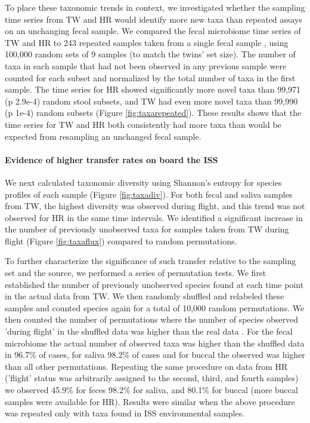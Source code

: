 To place these taxonomic trends in context, we investigated whether the sampling time series from TW and HR would identify more new taxa than repeated assays on an unchanging fecal sample. We compared the fecal microbiome time series of TW and HR to 243 repeated samples taken from a single fecal sample \citep{Sasada2020}, using 100,000 random sets of 9 samples (to match the twins' set size). The number of taxa in each sample that had not been observed in any previous sample were counted for each subset and normalized by the total number of taxa in the first sample. The time series for HR showed significantly more novel taxa than 99,971 (p 2.9e-4) random stool subsets, and TW had even more novel taxa than 99,990 (p 1e-4) random subsets (Figure \ref{fig:taxarepeated}). These results shows that the time series for TW and HR both consistently had more taxa than would be expected from resampling an unchanged fecal sample. 

\paragraph{Evidence of higher transfer rates on board the ISS}

We next calculated taxonomic diversity using Shannon's entropy for species profiles of each sample (Figure \ref{fig:taxadiv}). For both fecal and saliva samples from TW, the highest diversity was observed during flight, and this trend was not observed for HR in the same time intervals. We identified a significant increase in the number of previously unobserved taxa for samples taken from TW during flight (Figure \ref{fig:taxaflux}) compared to random permutations. 

To further characterize the significance of such transfer relative to the sampling set and the source, we performed a series of permutation tests. We first established the number of previously unobserved species found at each time point in the actual data from TW. We then randomly shuffled and relabeled these samples and counted species again for a total of 10,000 random permutations. We then counted the number of permutations where the number of species observed 'during flight' in the shuffled data was higher than the real data . For the fecal microbiome the actual number of observed taxa was higher than the shuffled data in 96.7\% of cases, for saliva 98.2\% of cases and for buccal the observed was higher than all other permutations. Repeating the same procedure on data from HR ('flight' status was arbitrarily assigned to the second, third, and fourth samples)  we observed 45.9\% for feces 98.2\% for saliva, and 80.1\% for buccal (more buccal samples were available for HR). Results were similar when the above procedure was repeated only with taxa found in ISS environmental samples.

